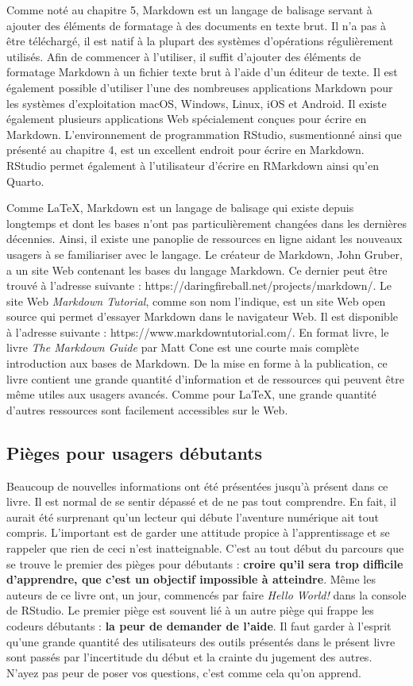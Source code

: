 \documentclass[
  letterpaper,
  DIV=11,
  numbers=noendperiod]{scrreprt}
\begin{document}
Comme noté au chapitre 5, Markdown est un langage de balisage servant à
ajouter des éléments de formatage à des documents en texte brut. Il n'a
pas à être téléchargé, il est natif à la plupart des systèmes
d'opérations régulièrement utilisés. Afin de commencer à l'utiliser, il
suffit d'ajouter des éléments de formatage Markdown à un fichier texte
brut à l'aide d'un éditeur de texte. Il est également possible
d'utiliser l'une des nombreuses applications Markdown pour les systèmes
d'exploitation macOS, Windows, Linux, iOS et Android. Il existe
également plusieurs applications Web spécialement conçues pour écrire en
Markdown. L'environnement de programmation RStudio, susmentionné ainsi
que présenté au chapitre 4, est un excellent endroit pour écrire en
Markdown. RStudio permet également à l'utilisateur d'écrire en RMarkdown
ainsi qu'en Quarto.

Comme \LaTeX, Markdown est un langage de balisage qui existe depuis
longtemps et dont les bases n'ont pas particulièrement changées dans les
dernières décennies. Ainsi, il existe une panoplie de ressources en
ligne aidant les nouveaux usagers à se familiariser avec le langage. Le
créateur de Markdown, John Gruber, a un site Web contenant les bases du
langage Markdown. Ce dernier peut être trouvé à l'adresse suivante :
https://daringfireball.net/projects/markdown/. Le site Web
\emph{Markdown Tutorial}, comme son nom l'indique, est un site Web open
source qui permet d'essayer Markdown dans le navigateur Web. Il est
disponible à l'adresse suivante : https://www.markdowntutorial.com/. En
format livre, le livre \emph{The Markdown Guide} par Matt Cone est une
courte mais complète introduction aux bases de Markdown. De la mise en
forme à la publication, ce livre contient une grande quantité
d'information et de ressources qui peuvent être même utiles aux usagers
avancés. Comme pour \LaTeX, une grande quantité d'autres ressources sont
facilement accessibles sur le Web.

\subsection{Pièges pour usagers
débutants}\label{piuxe8ges-pour-usagers-duxe9butants}

Beaucoup de nouvelles informations ont été présentées jusqu'à présent
dans ce livre. Il est normal de se sentir dépassé et de ne pas tout
comprendre. En fait, il aurait été surprenant qu'un lecteur qui débute
l'aventure numérique ait tout compris. L'important est de garder une
attitude propice à l'apprentissage et se rappeler que rien de ceci n'est
inatteignable. C'est au tout début du parcours que se trouve le premier
des pièges pour débutants : \textbf{croire qu'il sera trop difficile
d'apprendre, que c'est un objectif impossible à atteindre}. Même les
auteurs de ce livre ont, un jour, commencés par faire \emph{Hello
World!} dans la console de RStudio. Le premier piège est souvent lié à
un autre piège qui frappe les codeurs débutants : \textbf{la peur de
demander de l'aide}. Il faut garder à l'esprit qu'une grande quantité
des utilisateurs des outils présentés dans le présent livre sont passés
par l'incertitude du début et la crainte du jugement des autres. N'ayez
pas peur de poser vos questions, c'est comme cela qu'on apprend.
\end{document}
